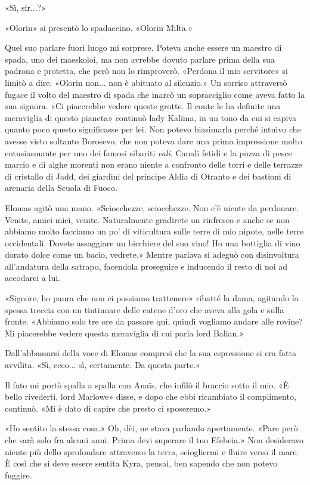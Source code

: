 «Sì, sir...?»

«Olorin» si presentò lo spadaccino. «Olorin Milta.»

Quel suo parlare fuori luogo mi sorprese. Poteva anche essere un maestro
di spada, uno dei maeskoloi, ma non avrebbe dovuto parlare prima della
sua padrona e protetta, che però non lo rimproverò. «Perdona il mio
servitore» si limitò a dire. «Olorin non... non è abituato al silenzio.»
Un sorriso attraversò fugace il volto del maestro di spada che inarcò un
sopracciglio come aveva fatto la sua signora. «Ci piacerebbe vedere
queste grotte. Il conte le ha definite una meraviglia di questo pianeta»
continuò lady Kalima, in un tono da cui si capiva quanto poco questo
significasse per lei. Non potevo biasimarla perché intuivo che avesse
visto soltanto Borosevo, che non poteva dare una prima impressione molto
entusiasmante per uno dei famosi sibariti \emph{eali}. Canali fetidi e
la puzza di pesce marcio e di alghe morenti non erano niente a confronto
delle torri e delle terrazze di cristallo di Jadd, dei giardini del
principe Aldia di Otranto e dei bastioni di arenaria della Scuola di
Fuoco.

Elomas agitò una mano. «Sciocchezze, sciocchezze. Non c'è niente da
perdonare. Venite, amici miei, venite. Naturalmente gradirete un
rinfresco e anche se non abbiamo molto facciamo un po' di viticultura
sulle terre di mio nipote, nelle terre occidentali. {Dovete} assaggiare
un bicchiere del suo vino! Ho una bottiglia di vino dorato dolce come un
bacio, vedrete.» Mentre parlava si adeguò con disinvoltura all'andatura
della satrapo, facendola proseguire e inducendo il resto di noi ad
accodarci a lui.

«Signore, ho paura che non ci possiamo trattenere» ribatté la dama,
agitando la spessa treccia con un tintinnare delle catene d'oro che
aveva alla gola e sulla fronte. «Abbiamo solo tre ore da passare qui,
quindi vogliamo andare alle rovine? Mi piacerebbe vedere questa
meraviglia di cui parla lord Balian.»

Dall'abbassarsi della voce di Elomas compresi che la sua espressione si
era fatta avvilita. «Sì, ecco... sì, certamente. Da questa parte.»

Il fato mi portò spalla a spalla con Anaïs, che infilò il braccio sotto
il mio. «È bello rivederti, lord Marlowe» disse, e dopo che ebbi
ricambiato il complimento, continuò. «Mi è dato di capire che presto ci
sposeremo.»

«Ho sentito la stessa cosa.» Oh, dèi, ne stava parlando apertamente.
«Pare però che sarà solo fra alcuni anni. Prima devi superare il tuo
Efebeia.» Non desideravo niente più dello sprofondare attraverso la
terra, sciogliermi e fluire verso il mare. È così che si deve essere
sentita Kyra, pensai, ben sapendo che non potevo fuggire.

